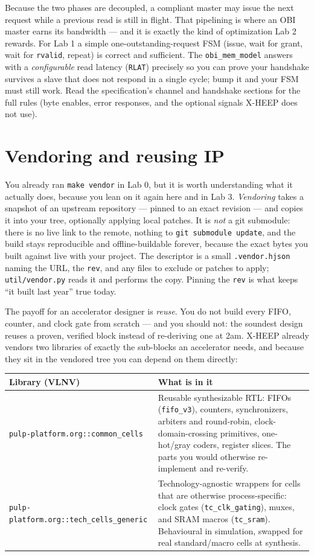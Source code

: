 \documentclass[11pt]{article}
\newcommand{\code}[1]{\texttt{#1}}
\begin{document}
Because the two phases are decoupled, a compliant master may issue the next
request while a previous read is still in flight. That pipelining is where an OBI
master earns its bandwidth --- and it is exactly the kind of optimization Lab 2
rewards. For Lab 1 a simple one-outstanding-request FSM (issue, wait for grant,
wait for \code{rvalid}, repeat) is correct and sufficient. The
\code{obi\_mem\_model} answers with a \emph{configurable} read latency
(\code{RLAT}) precisely so you can prove your handshake survives a slave that
does not respond in a single cycle; bump it and your FSM must still work. Read
the specification's channel and handshake sections for the full rules (byte
enables, error responses, and the optional signals X-HEEP does not use).

\section{Vendoring and reusing IP}

You already ran \code{make vendor} in Lab 0, but it is worth understanding what
it actually does, because you lean on it again here and in Lab 3.
\emph{Vendoring} takes a snapshot of an upstream repository --- pinned to an
exact revision --- and copies it into your tree, optionally applying local
patches. It is \emph{not} a git submodule: there is no live link to the remote,
nothing to \code{git submodule update}, and the build stays reproducible and
offline-buildable forever, because the exact bytes you built against live with
your project. The descriptor is a small \code{.vendor.hjson} naming the URL, the
\code{rev}, and any files to exclude or patches to apply; \code{util/vendor.py}
reads it and performs the copy. Pinning the \code{rev} is what keeps ``it built
last year'' true today.

The payoff for an accelerator designer is \emph{reuse}. You do not build every
FIFO, counter, and clock gate from scratch --- and you should not: the soundest
design reuses a proven, verified block instead of re-deriving one at 2am.
X-HEEP already vendors two libraries of exactly the sub-blocks an accelerator
needs, and because they sit in the vendored tree you can depend on them
directly:

\begin{center}
\small
\begin{tabular}{@{}lp{9.0cm}@{}}
\toprule
Library (VLNV) & What is in it \\
\midrule
\code{pulp-platform.org::common\_cells}
  & Reusable synthesizable RTL: FIFOs (\code{fifo\_v3}), counters,
    synchronizers, arbiters and round-robin, clock-domain-crossing primitives,
    one-hot/gray coders, register slices. The parts you would otherwise
    re-implement and re-verify. \\
\addlinespace
\code{pulp-platform.org::tech\_cells\_generic}
  & Technology-agnostic wrappers for cells that are otherwise process-specific:
    clock gates (\code{tc\_clk\_gating}), muxes, and SRAM macros
    (\code{tc\_sram}). Behavioural in simulation, swapped for real
    standard/macro cells at synthesis. \\
\bottomrule
\end{tabular}
\end{center}
\end{document}
